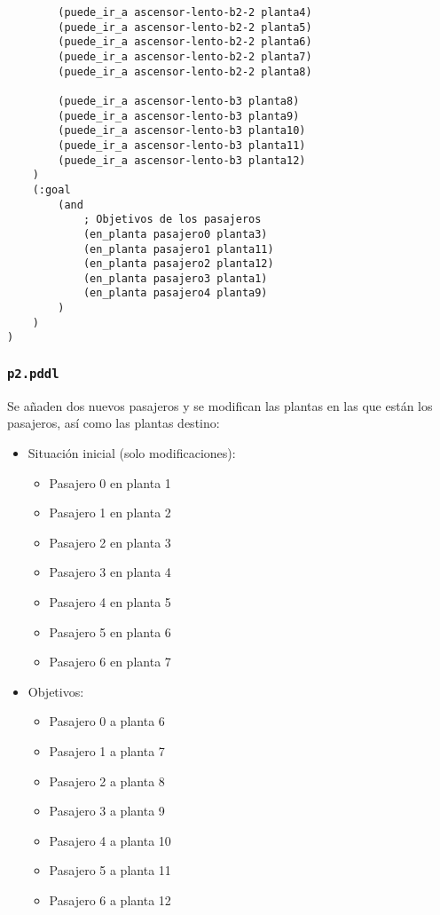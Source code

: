 \documentclass{article}
\begin{document}
\begin{verbatim}
        (puede_ir_a ascensor-lento-b2-2 planta4)
        (puede_ir_a ascensor-lento-b2-2 planta5)
        (puede_ir_a ascensor-lento-b2-2 planta6)
        (puede_ir_a ascensor-lento-b2-2 planta7)
        (puede_ir_a ascensor-lento-b2-2 planta8)

        (puede_ir_a ascensor-lento-b3 planta8)
        (puede_ir_a ascensor-lento-b3 planta9)
        (puede_ir_a ascensor-lento-b3 planta10)
        (puede_ir_a ascensor-lento-b3 planta11)
        (puede_ir_a ascensor-lento-b3 planta12)
    )
    (:goal
        (and
            ; Objetivos de los pasajeros
            (en_planta pasajero0 planta3)
            (en_planta pasajero1 planta11)
            (en_planta pasajero2 planta12)
            (en_planta pasajero3 planta1)
            (en_planta pasajero4 planta9)
        )
    )
)
\end{verbatim}

\subsubsection{\texttt{p2.pddl}}
Se añaden dos nuevos pasajeros y se modifican las plantas en las que están los pasajeros, así como las plantas destino:

\begin{itemize}
    \item Situación inicial (solo modificaciones):
    \begin{itemize}
        \item Pasajero 0 en planta 1
        \item Pasajero 1 en planta 2
        \item Pasajero 2 en planta 3
        \item Pasajero 3 en planta 4
        \item Pasajero 4 en planta 5
        \item Pasajero 5 en planta 6
        \item Pasajero 6 en planta 7
    \end{itemize}
    \item Objetivos:
    \begin{itemize}
        \item Pasajero 0 a planta 6
        \item Pasajero 1 a planta 7
        \item Pasajero 2 a planta 8
        \item Pasajero 3 a planta 9
        \item Pasajero 4 a planta 10
        \item Pasajero 5 a planta 11
        \item Pasajero 6 a planta 12
    \end{itemize}
\end{itemize}
\end{document}
